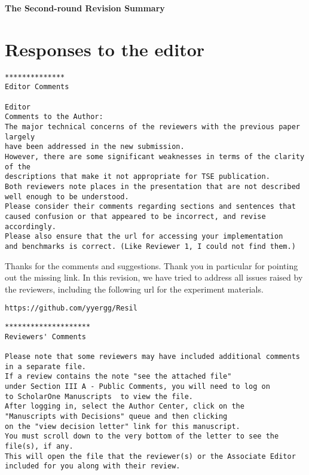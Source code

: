 \documentclass[times,10pt,twocolumn]{article}
\newcounter{cabbage0}
\newcounter{cabbage1}
\newcounter{cabbage2}
\newcounter{cabbage3}
\newcounter{bean0}
\newcounter{bean1}
\newcounter{bean2}
\newcounter{bean3}
\newcounter{bean4}
\newcounter{bean5}
\newcounter{bean6}
\newenvironment{reply0}{\begin{list}{\bf (Reply 0.\arabic{bean0}):} 
        {\usecounter{bean0}\setcounter{bean0}{\value{cabbage0}} \item \setcounter{cabbage0}{\value{bean0}} 
        }
}{\end{list}}
\begin{document}
\newpage 
\begin{center} 
\bf\LARGE The Second-round Revision Summary 
\end{center} 
\section{Responses to the editor} 

\begin{verbatim} 
**************
Editor Comments

Editor
Comments to the Author:
The major technical concerns of the reviewers with the previous paper largely 
have been addressed in the new submission.  
However, there are some significant weaknesses in terms of the clarity of the 
descriptions that make it not appropriate for TSE publication.  
Both reviewers note places in the presentation that are not described 
well enough to be understood.  
Please consider their comments regarding sections and sentences that 
caused confusion or that appeared to be incorrect, and revise accordingly.   
Please also ensure that the url for accessing your implementation 
and benchmarks is correct. (Like Reviewer 1, I could not find them.)
\end{verbatim} 
\begin{reply0} 
Thanks for the comments and suggestions.  
Thank you in particular for pointing out the missing link. 
In this revision, we have tried to address all issues raised by the 
reviewers, including the following url for the experiment materials. 
\begin{center}
\verb+https://github.com/yyergg/Resil+
\end{center} 
\end{reply0} 
\begin{verbatim} 
********************
Reviewers' Comments

Please note that some reviewers may have included additional comments 
in a separate file. 
If a review contains the note "see the attached file" 
under Section III A - Public Comments, you will need to log on 
to ScholarOne Manuscripts  to view the file. 
After logging in, select the Author Center, click on the 
"Manuscripts with Decisions" queue and then clicking 
on the "view decision letter" link for this manuscript. 
You must scroll down to the very bottom of the letter to see the file(s), if any.  
This will open the file that the reviewer(s) or the Associate Editor 
included for you along with their review.

\end{verbatim} 
\end{document}
